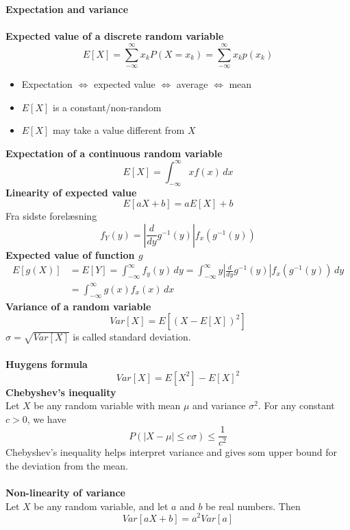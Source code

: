 \documentclass[12pt,a4paper,draft]{report}
\author{Frederik Appel Vardinghus-Nielsen}
\begin{document}
\noindent \textbf{Expectation and variance}\\\\
\textbf{Expected value of a discrete random variable}
\begin{equation}
E[X]=\sum_{-\infty}^{\infty}x_k P(X=x_k)=\sum_{-\infty}^{\infty}x_k p(x_k)
\end{equation}
\begin{itemize}
\setlength\itemsep{0em}
\item Expectation $\Leftrightarrow$ expected value $\Leftrightarrow$ average $\Leftrightarrow$ mean
\item $E[X]$ is a constant/non-random
\item $E[X]$ may take a value different from $X$
\end{itemize}
\textbf{Expectation of a continuous random variable}
\begin{equation}
E[X]=\int_{-\infty}^{\infty}\! xf(x)\, dx
\end{equation}
\textbf{Linearity of expected value}
\begin{equation}
E[aX+b]=aE[X]+b
\end{equation}
Fra sidste forelæsning
\begin{equation}
f_Y(y)=\left|\frac{d}{dy}g^{-1}(y)\right|f_x(g^{-1}(y))
\end{equation}
\textbf{Expected value of function $g$}
\begin{align}
E[g(X)]&=E[Y]=\int_{-\infty}^{\infty}\!f_y(y)\, dy=\int_{-\infty}^{\infty} \! y\left|\frac{d}{dy}g^{-1}(y)\right|f_x(g^{-1}(y))\, dy\\
&=\int_{-\infty}^{\infty} \! g(x)f_x(x)\, dx
\end{align}
\textbf{Variance of a random variable}
\begin{equation}
Var[X]=E[(X-E[X])^2]
\end{equation}
$\sigma=\sqrt{Var[X]}$ is called standard deviation.\\\\
\textbf{Huygens formula}
\begin{equation}
Var[X]=E[X^2]-E[X]^2
\end{equation}
\textbf{Chebyshev's inequality}\\
Let $X$ be any random variable with mean $\mu$ and variance $\sigma ^2$. For any constant $c>0$, we have
\begin{equation}
P(|X-\mu|\leq c\sigma)\leq\frac{1}{c^2}
\end{equation}
Chebyshev's inequality helps interpret variance and gives som upper bound for the deviation from the mean.\\\\
\textbf{Non-linearity of variance}\\
Let $X$ be any random variable, and let $a$ and $b$ be real numbers. Then
\begin{equation}
Var[aX+b]=a^2Var[a]
\end{equation}
\end{document}
